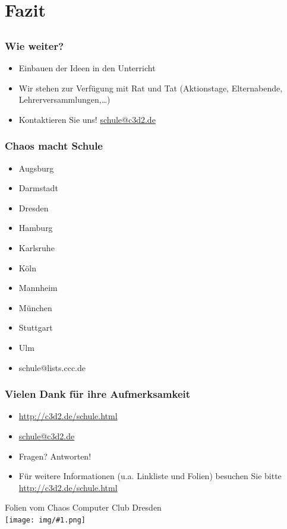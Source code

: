 \documentclass[14pt,handout]{beamer}
\newcommand{\cc}[1]{\texttt{[image: img/\#1.png]}}
\begin{document}
\section{Fazit}
\subsection{}

\begin{frame}
    \frametitle{Wie weiter?}
    \begin{itemize}
        \item<2-> Einbauen der Ideen in den Unterricht
        \item<3-> Wir stehen zur Verfügung mit Rat und Tat (Aktionstage, Elternabende, Lehrerversammlungen,\ldots)
        \item<4-> Kontaktieren Sie uns! \url{schule@c3d2.de}
    \end{itemize}
\end{frame}

\begin{frame}
    \frametitle{Chaos macht Schule}
    \begin{itemize}
        \item <2-> Augsburg
        \item <2-> Darmstadt
        \item <2-> Dresden
        \item <2-> Hamburg
        \item <2-> Karlsruhe
        \item <2-> Köln
        \item <2-> Mannheim
        \item <2-> München
        \item <2-> Stuttgart
        \item <2-> Ulm
        \item <3-> schule@lists.ccc.de
    \end{itemize}
\end{frame}


\begin{frame}
    \frametitle{Vielen Dank für ihre Aufmerksamkeit}
    \begin{itemize}
        \item \url{http://c3d2.de/schule.html}
        \item \url{schule@c3d2.de}
        \item Fragen? Antworten!
        \item Für weitere Informationen (u.a. Linkliste und Folien) besuchen Sie bitte \url{http://c3d2.de/schule.html}
    \end{itemize}
    \begin{center}
   Folien vom Chaos Computer Club Dresden\\
   {\cc{by-sa}}
   \end{center}
\end{frame}
\end{document}
